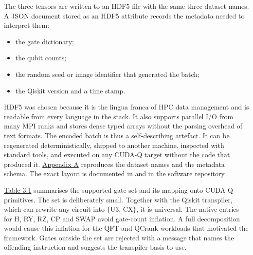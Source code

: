 \documentclass{report}
\theoremstyle{plain}
\theoremstyle{definition}
\theoremstyle{remark}
\begin{document}
The three tensors are written to an HDF5 file with the same three dataset names. A JSON document stored as an HDF5 attribute records the metadata needed to interpret them:
\begin{itemize}
  \item the gate dictionary;
  \item the qubit counts;
  \item the random seed or image identifier that generated the batch;
  \item the Qiskit version and a time stamp.
\end{itemize}
HDF5 was chosen because it is the lingua franca of HPC data management and is readable from every language in the stack. It also supports parallel I/O from many MPI ranks and stores dense typed arrays without the parsing overhead of text formats. The encoded batch is thus a self-describing artefact. It can be regenerated deterministically, shipped to another machine, inspected with standard tools, and executed on any CUDA-Q target without the code that produced it. \hyperref[app:qgear]{Appendix A} reproduces the dataset names and the metadata schema. The exact layout is documented in \cite{guo2025qgear} and in the software repository \cite{guo2025qgearsoftware}.

\hyperref[tab:qgear:gates]{Table 3.1} summarises the supported gate set and its mapping onto CUDA-Q primitives. The set is deliberately small. Together with the Qiskit transpiler, which can rewrite any circuit into $\{$U3, CX$\}$, it is universal. The native entries for H, RY, RZ, CP and SWAP avoid gate-count inflation. A full decomposition would cause this inflation for the QFT and QCrank workloads that motivated the framework. Gates outside the set are rejected with a message that names the offending instruction and suggests the transpiler basis to use.
\end{document}
